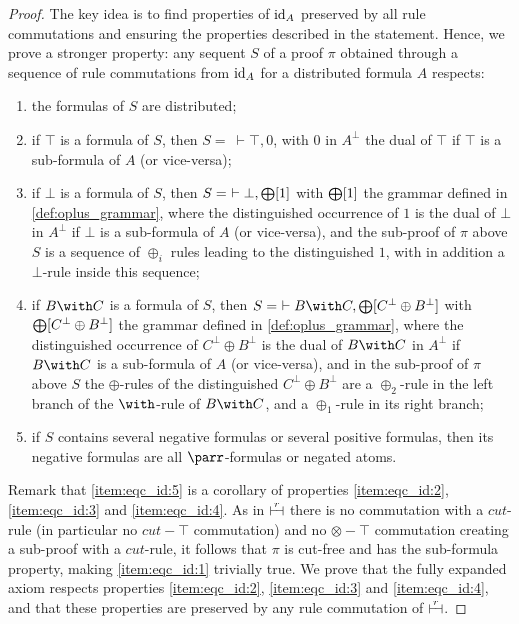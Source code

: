 \documentclass{lmcs}
\newcommand*{\orth}{^\perp} %
\newcommand*{\tens}{\otimes} %
\renewcommand*{\fCenter}{\vdash} %
\newcommand{\vdashv}{\mathrel{\lower .22ex \hbox{$\vdash\!\dashv$}}}
\DeclareRobustCommand{\astsymbol}[1]{\mathrel{\ooalign{{$\vdashv$}\crcr{$\stackrel{#1}{\hphantom{\vdashv}\vphantom{\to}}$}}}}
\newcommand{\eqcone}{\astsymbol{r}} %
\newcommand*{\pcontext}[1]{\resizebox{!}{7pt}{$\bigoplus$}[#1]}
\newcommand*{\id}[1]{\ensuremath{\textnormal{id}_{#1}}}
\begin{document}
\begin{proof}
The key idea is to find properties of $\id{A}$ preserved by all rule commutations and ensuring the properties described in the statement.
Hence, we prove a stronger property: any sequent $S$ of a proof $\pi$ obtained through a sequence of rule commutations from $\id{A}$ for a distributed formula $A$ respects:
\begin{enumerate}[(1)]
\item\label{item:eqc_id:1}
the formulas of $S$ are distributed;
\item\label{item:eqc_id:2}
if $\top$ is a formula of $S$, then $S=~\fCenter \top,0$, with $0$ in $A\orth$ the dual of $\top$ if $\top$ is a sub-formula of $A$ (or vice-versa);
\item\label{item:eqc_id:3}
if $\bot$ is a formula of $S$, then $S=~\fCenter \bot,\pcontext{1}$ with $\pcontext{1}$ the grammar defined in \autoref{def:oplus_grammar}, where the distinguished occurrence of $1$ is the dual of $\bot$ in $A\orth$ if $\bot$ is a sub-formula of $A$ (or vice-versa), and the sub-proof of $\pi$ above $S$ is a sequence of $\oplus_i$ rules leading to the distinguished $1$, with in addition a $\bot$-rule inside this sequence;
\item\label{item:eqc_id:4}
if $B\with C$ is a formula of $S$, then $S=~\fCenter B\with C,\pcontext{C\orth\oplus B\orth}$ with $\pcontext{C\orth\oplus B\orth}$ the grammar defined in \autoref{def:oplus_grammar}, where the distinguished occurrence of $C\orth\oplus B\orth$ is the dual of $B\with C$ in $A\orth$ if $B\with C$ is a sub-formula of $A$ (or vice-versa), and in the sub-proof of $\pi$ above $S$ the $\oplus$-rules of the distinguished $C\orth\oplus B\orth$ are a $\oplus_2$-rule in the left branch of the $\with$-rule of $B\with C$, and a $\oplus_1$-rule in its right branch;
\item\label{item:eqc_id:5}
if $S$ contains several negative formulas or several positive formulas, then its negative formulas are all $\parr$-formulas or negated atoms.
\end{enumerate}
Remark that \ref{item:eqc_id:5} is a corollary of properties \ref{item:eqc_id:2}, \ref{item:eqc_id:3} and \ref{item:eqc_id:4}.
As in $\eqcone$ there is no commutation with a $cut$-rule (in particular no $cut-\top$ commutation) and no $\tens-\top$ commutation creating a sub-proof with a $cut$-rule, it follows that $\pi$ is cut-free and has the sub-formula property, making \ref{item:eqc_id:1} trivially true.
We prove that the fully expanded axiom respects properties \ref{item:eqc_id:2}, \ref{item:eqc_id:3} and \ref{item:eqc_id:4}, and that these properties are preserved by any rule commutation of $\eqcone$.


\end{proof}
\end{document}
